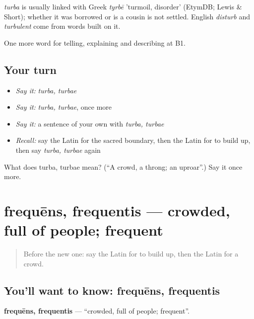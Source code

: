 \begin{cousinweb}
\emph{turba} is usually linked with Greek \emph{tyrbē} 'turmoil, disorder' (EtymDB; Lewis \& Short); whether it was borrowed or is a cousin is not settled. English \emph{disturb} and \emph{turbulent} come from words built on it.
\end{cousinweb}

\begin{grammarlens}[title={What you've built}]
One more word for telling, explaining and describing at B1.
\end{grammarlens}

\subsection*{Your turn}
\begin{itemize}
\raggedright
  \item \emph{Say it:} \emph{turba, turbae}
  \item \emph{Say it:} \emph{turba, turbae}, once more
  \item \emph{Say it:} a sentence of your own with \emph{turba, turbae}
  \item \emph{Recall:} say the Latin for the sacred boundary, then the Latin for to build up, then say \emph{turba, turbae} again
\end{itemize}

\begin{tcolorbox}[breakable,colback=teal!4,colframe=teal!35!black,title={Before you move on}]
What does turba, turbae mean? (\textquotedblleft{}A crowd, a throng; an uproar\textquotedblright{}.) Say it once more.
\end{tcolorbox}
\section[frequēns, frequentis]{frequēns, frequentis — crowded, full of people; frequent}

\label{lesson:LA-C460-frequens}



\begin{quote}
Before the new one: say the Latin for to build up, then the Latin for a crowd.
\end{quote}

\subsection*{You'll want to know: frequēns, frequentis}
\textbf{frequēns, frequentis} — \textquotedblleft{}crowded, full of people; frequent\textquotedblright{}.

